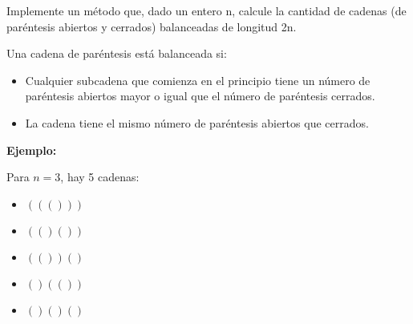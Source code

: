 Implemente un método que, dado un entero n, calcule la cantidad de cadenas (de paréntesis abiertos y cerrados) balanceadas de longitud 2n.

Una cadena de paréntesis está balanceada si:
\begin{itemize}
    \item Cualquier subcadena que comienza en el principio tiene un número de paréntesis abiertos mayor o igual que el número de paréntesis cerrados.
    \item La cadena tiene el mismo número de paréntesis abiertos que cerrados.
\end{itemize}

\textbf{Ejemplo:}

Para \( n = 3 \), hay 5 cadenas:
\begin{itemize}
    \item \( ((())) \)
    \item \( (()()) \)
    \item \( (())() \)
    \item \( ()(()) \)
    \item \( ()()() \)
\end{itemize}